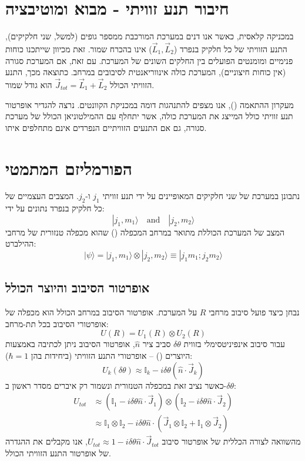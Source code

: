 \section{חיבור תנע זוויתי - מבוא ומוטיבציה}

במכניקה קלאסית, כאשר אנו דנים במערכת המורכבת ממספר גופים (למשל, שני חלקיקים), התנע הזוויתי של כל חלקיק בנפרד ($\vec{L}_1, \vec{L}_2$) אינו בהכרח שמור. זאת מכיוון שייתכנו כוחות פנימיים ומומנטים הפועלים בין החלקים השונים של המערכת.
עם זאת, אם המערכת סגורה (אין כוחות חיצוניים), המערכת כולה אינווריאנטית לסיבובים במרחב. כתוצאה מכך, התנע הזוויתי הכולל $\vec{J}_{tot} = \vec{L}_1 + \vec{L}_2$ הוא גודל שמור.

מעקרון ההתאמה (), אנו מצפים להתנהגות דומה במכניקת הקוונטים. נרצה להגדיר אופרטור תנע זוויתי כולל המייצג את המערכת כולה, אשר יתחלף עם ההמילטוניאן הכולל של מערכת סגורה, גם אם התנעים הזוויתיים הנפרדים אינם מתחלפים איתו.

\section{הפורמליזם המתמטי}

נתבונן במערכת של שני חלקיקים המאופיינים על ידי תנע זוויתי $j_1$ ו-$j_2$. המצבים העצמיים של כל חלקיק בנפרד נתונים על ידי:
\[
|j_1, m_1\rangle \quad \text{and} \quad |j_2, m_2\rangle
\]
המצב של המערכת הכוללת מתואר במרחב המכפלה () שהוא מכפלה טנזורית של מרחבי ההילברט:
\[
|\psi\rangle = |j_1, m_1\rangle \otimes |j_2, m_2\rangle \equiv |j_1 m_1; j_2 m_2\rangle
\]

\subsection{אופרטור הסיבוב והיוצר הכולל}
נבחן כיצד פועל סיבוב מרחבי $R$ על המערכת. אופרטור הסיבוב במרחב הכולל הוא מכפלה של אופרטורי הסיבוב בכל תת-מרחב:
\[
U(R) = U_1(R) \otimes U_2(R)
\]
עבור סיבוב אינפיניטסימלי בזווית $\delta\theta$ סביב ציר $\hat{n}$, אופרטור הסיבוב ניתן לכתיבה באמצעות היוצרים () -- אופרטורי התנע הזוויתי (ביחידות בהן $\hbar=1$):
\[
U_k(\delta\theta) \approx \mathbb{I}_k - i \delta\theta (\hat{n} \cdot \vec{J}_k)
\]
כאשר נציב זאת במכפלה הטנזורית ונשמור רק איברים מסדר ראשון ב-$\delta\theta$:
\begin{align*}
U_{tot} &\approx \left(\mathbb{I}_1 - i \delta\theta \hat{n}\cdot\vec{J}_1\right) \otimes \left(\mathbb{I}_2 - i \delta\theta \hat{n}\cdot\vec{J}_2\right) \\
&\approx \mathbb{I}_1 \otimes \mathbb{I}_2 - i \delta\theta \hat{n} \cdot \left( \vec{J}_1 \otimes \mathbb{I}_2 + \mathbb{I}_1 \otimes \vec{J}_2 \right)
\end{align*}
מהשוואה לצורה הכללית של אופרטור סיבוב $U_{tot} \approx 1 - i \delta\theta \hat{n} \cdot \vec{J}_{tot}$, אנו מקבלים את ההגדרה של אופרטור התנע הזוויתי הכולל.

